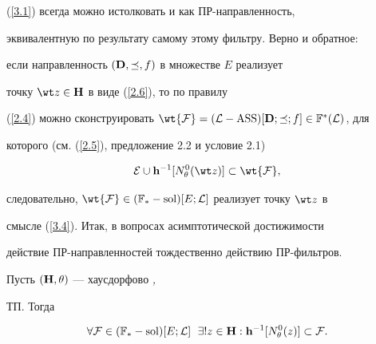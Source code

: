 {(\ref{3.1}) всегда можно истолковать и как ПР-направленность,


эквивалентную по результату самому этому фильтру. Верно и обратное:


если направленность $({\bold D},\preceq,f)$ в множестве $E$ реализует


точку ${\wt z} \in {\bold H}$ в виде (\ref{2.6}), то по правилу


(\ref{2.4}) можно сконструировать ${\wt {\cal F}} = ({\cal


L}-\ASS)[{\bold D};\preceq;f] \in {{\Bbb F}^*}({\cal L})$, для


которого (см. (\ref{2.5}), предложение 2.2 и условие 2.1)


\begin{equation}\label{3.4}


{\cal E}\cup{{\bold h}^{-1}}[{N_\theta^0}({\wt z})]


\subset {\wt {\cal F}},


\end{equation}


следовательно, ${\wt {\cal F}} \in


({{\Bbb F}_*}-\sol)[E;{\cal L}]$ реализует точку $\wt z$ в


смысле (\ref{3.4}). Итак, в вопросах асимптотической достижимости


действие ПР-направленностей тождественно действию ПР-фильтров.








\begin{props}


Пусть $({\bold H},\theta)$ --- хаусдорфово {\em \cite{1}, \cite{4}}


ТП. Тогда


$$


\fo{\cal F} \in ({{\Bbb F}_*}-\sol)[E;{\cal L}]\ \;\exi{!}z \in


{\bold H}:{{\bold h}^{-1}}[{N_\theta^0}(z)] \subset {\cal F}.


$$


\end{props}








}
